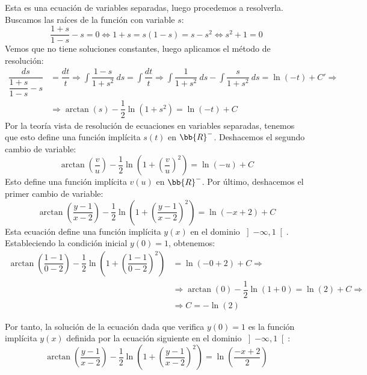 \begin{ejercicio}
    Esta es una ecuación de variables separadas, luego procedemos a resolverla. Buscamos las raíces de la función con variable $s$:
    \begin{equation*}
        \dfrac{1+s}{1-s} - s = 0 \Longleftrightarrow 1+s = s(1-s) = s-s^2 \Longleftrightarrow s^2+1=0
    \end{equation*}
    Vemos que no tiene soluciones constantes, luego aplicamos el método de resolución:
    \begin{align*}
        \dfrac{ds}{\dfrac{1+s}{1-s} - s} &= \dfrac{dt}{t} \Longrightarrow \int \dfrac{1-s}{1+s^2} ~ds = \int \dfrac{dt}{t} \Longrightarrow \int \dfrac{1}{1+s^2} ~ds - \int \dfrac{s}{1+s^2} ~ds = \ln(-t)+C'
        \Longrightarrow \\ &\Longrightarrow \arctan(s) - \dfrac{1}{2}\ln(1+s^2) = \ln(-t)+C
    \end{align*}
    Por la teoría vista de resolución de ecuaciones en variables separadas, tenemos que esto define una función implícita $s(t)$ en $\bb{R}^-$.
    Deshacemos el segundo cambio de variable:
    \begin{equation*}
        \arctan\left(\dfrac{v}{u}\right) - \dfrac{1}{2}\ln\left(1+\left(\dfrac{v}{u}\right)^2\right) = \ln(-u)+C
    \end{equation*}
    Esto define una función implícita $v(u)$ en $\bb{R}^-$.
    Por último, deshacemos el primer cambio de variable:
    \begin{equation*}
        \arctan\left(\dfrac{y-1}{x-2}\right) - \dfrac{1}{2}\ln\left(1+\left(\dfrac{y-1}{x-2}\right)^2\right) = \ln(-x+2)+C
    \end{equation*}
    Esta ecuación define una función implícita $y(x)$ en el dominio $\left]-\infty, 1\right[$. Estableciendo la condición inicial $y(0)=1$, obtenemos:
    \begin{align*}
        \arctan\left(\dfrac{1-1}{0-2}\right) - \dfrac{1}{2}\ln\left(1+\left(\dfrac{1-1}{0-2}\right)^2\right) &= \ln(-0+2)+C \Longrightarrow \\ &\Longrightarrow \arctan\left(0\right) - \dfrac{1}{2}\ln\left(1+0\right) = \ln(2)+C \Longrightarrow \\ &\Longrightarrow C=-\ln(2)
    \end{align*}

    Por tanto, la solución de la ecuación dada que verifica $y(0)=1$ es la función implícita $y(x)$ definida por la ecuación siguiente en el dominio $\left]-\infty, 1\right[$:
    \begin{equation*}
        \arctan\left(\dfrac{y-1}{x-2}\right) - \dfrac{1}{2}\ln\left(1+\left(\dfrac{y-1}{x-2}\right)^2\right) = \ln\left(\dfrac{-x+2}{2}\right)
    \end{equation*}
\end{ejercicio}

